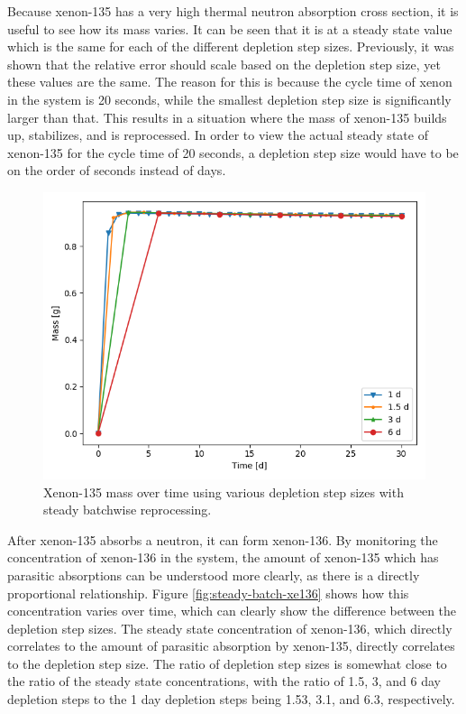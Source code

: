 Because xenon-135 has a very high thermal neutron absorption cross section, it is useful to see how its mass varies. It can be seen that it is at a steady state value which is the same for each of the different depletion step sizes. Previously, it was shown that the relative error should scale based on the depletion step size, yet these values are the same. The reason for this is because the cycle time of xenon in the system is 20 seconds, while the smallest depletion step size is significantly larger than that. This results in a situation where the mass of xenon-135 builds up, stabilizes, and is reprocessed. In order to view the actual steady state of xenon-135 for the cycle time of 20 seconds, a depletion step size would have to be on the order of seconds instead of days.

\begin{figure}[H]
  \centering
  \includegraphics[scale=0.7]{images/Xe135_sp_comp.png}
  \caption{Xenon-135 mass over time using various depletion step sizes with steady batchwise reprocessing.}
   \label{fig:steady-batch-xe135}
\end{figure}

After xenon-135 absorbs a neutron, it can form xenon-136. By monitoring the concentration of xenon-136 in the system, the amount of xenon-135 which has parasitic absorptions can be understood more clearly, as there is a directly proportional relationship. Figure \ref{fig:steady-batch-xe136} shows how this concentration varies over time, which can clearly show the difference between the depletion step sizes. The steady state concentration of xenon-136, which directly correlates to the amount of parasitic absorption by xenon-135, directly correlates to the depletion step size. The ratio of depletion step sizes is somewhat close to the ratio of the steady state concentrations, with the ratio of 1.5, 3, and 6 day depletion steps to the 1 day depletion steps being 1.53, 3.1, and 6.3, respectively.

